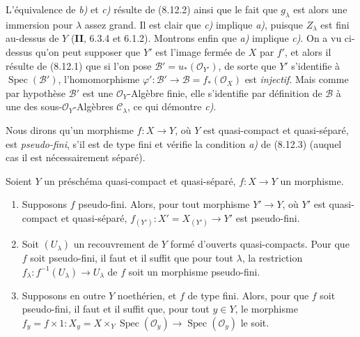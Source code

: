 L'équivalence de \emph{b)} et \emph{c)} résulte de (8.12.2) ainsi que le fait
que $g_\lambda$ est alors une immersion pour $\lambda$ assez grand. Il est
clair que \emph{c)} implique \emph{a)}, puisque $Z_\lambda$ est fini
au-dessus de $Y$ (\textbf{II}, 6.3.4 et 6.1.2). Montrons enfin que \emph{a)} implique
\emph{c)}. On a vu ci-dessus qu'on peut supposer que $Y'$ est l'image fermée
de $X$ par $f'$, et alors il résulte de (8.12.1) que si l'on pose
$\mathcal B'=u_*(\mathcal O_{Y'})$, de sorte que $Y'$ s'identifie à
$\operatorname{Spec}(\mathcal B')$, l'homomorphisme
$\varphi':\mathcal B'\to\mathcal B=f_*(\mathcal O_X)$ est \emph{injectif}.
Mais comme par hypothèse $\mathcal B'$ est une $\mathcal O_Y$-Algèbre finie,
elle s'identifie par définition de $\mathcal B$ à une des
sous-$\mathcal O_Y$-Algèbres $\mathcal C_\lambda$, ce qui démontre
\emph{c)}.

Nous dirons qu'un morphisme $f:X\to Y$, où $Y$ est quasi-compact et
quasi-séparé, est \emph{pseudo-fini}, s'il est de type fini et vérifie la
condition \emph{a)} de (8.12.3) (auquel cas il est nécessairement séparé).

\begin{corollary}[8.12.4]
\label{IV.8.12.4-fr}
Soient $Y$ un préschéma quasi-compact et quasi-séparé, $f:X\to Y$ un
morphisme.
\begin{enumerate}
\item[\textup{(i)}] Supposons $f$ pseudo-fini. Alors, pour tout morphisme $Y'\to Y$,
où $Y'$ est quasi-compact et quasi-séparé,
$f_{(Y')}:X'=X_{(Y')}\to Y'$ est pseudo-fini.
\item[\textup{(ii)}] Soit $(U_\lambda)$ un recouvrement de $Y$ formé d'ouverts
quasi-compacts. Pour que $f$ soit pseudo-fini, il faut et il suffit que pour
tout $\lambda$, la restriction
$f_\lambda:f^{-1}(U_\lambda)\to U_\lambda$ de $f$ soit un morphisme
pseudo-fini.
\item[\textup{(iii)}] Supposons en outre $Y$ noethérien, et $f$ de type fini. Alors,
pour que $f$ soit pseudo-fini, il faut et il suffit que, pour tout $y\in Y$,
le morphisme
$f_y=f\times 1:X_y=X\times_Y\operatorname{Spec}(\mathcal O_y)
\to\operatorname{Spec}(\mathcal O_y)$ le soit.
\end{enumerate}
\end{corollary}

